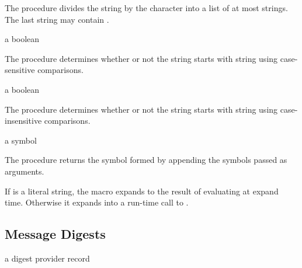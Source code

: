 The  procedure divides the  string by the
 character into a list of at most  strings. The
last string may contain .

\begin{procedure}
\end{procedure}
\returns{} a boolean

The  procedure determines whether or not the string
 starts with string  using case-sensitive comparisons.

\begin{procedure}
\end{procedure}
\returns{} a boolean

The  procedure determines whether or not the
string  starts with string  using case-insensitive
comparisons.

\begin{procedure}
\end{procedure}
\returns{} a symbol

The  procedure returns the symbol formed by
appending the symbols passed as arguments.

\begin{syntax}
\end{syntax}
\expandsto{}

If  is a literal string, the  macro expands to the
result of evaluating  at expand time.
Otherwise it expands into a run-time call to .

\subsection {Message Digests}

\begin{procedure}
\end{procedure}
\returns{} a digest provider record

